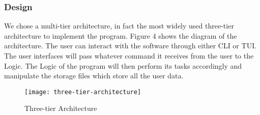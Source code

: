 \documentclass[12pt, a4paper]{article}
\begin{document}
\subsubsection{Design}
We chose a multi-tier architecture, in fact the most widely used
three-tier architecture to implement the program. Figure 4 shows the diagram of
the architecture. The user can interact with the software through either CLI or TUI.
The user interfaces will pass whatever command it receives from the user to the Logic.
The Logic of the program will then perform its tasks accordingly and manipulate the storage
files which store all the user data.

\begin{figure}[h]
  \centering
  \texttt{[image: three-tier-architecture]}
  \caption{Three-tier Architecture}
\end{figure}
\end{document}
